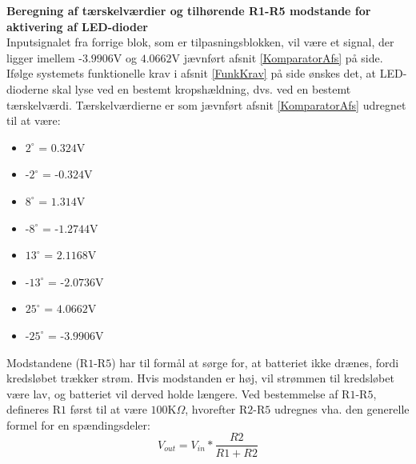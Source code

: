 \noindent\textbf{Beregning af tærskelværdier og tilhørende R1-R5 modstande for aktivering af LED-dioder} \\
Inputsignalet fra forrige blok, som er tilpasningsblokken, vil være et signal, der ligger imellem -$3.9906$V og $4.0662$V jævnført afsnit \ref{KomparatorAfs} på side\pageref{KomparatorAfs}. Ifølge systemets funktionelle krav i afsnit \ref{FunkKrav} på side \pageref{FunkKrav} ønskes det, at LED-dioderne skal lyse ved en bestemt kropshældning, dvs. ved en bestemt tærskelværdi. %
Tærskelværdierne er som jævnført afsnit \ref{KomparatorAfs} udregnet til at være:
\begin{itemize}
\item $2^{\circ}$ = $0.324$V
\item -$2^{\circ}$ = -$0.324$V
\item $8^{\circ}$ = $1.314$V
\item -$8^{\circ}$ = -$1.2744$V
\item $13^{\circ}$ = $2.1168$V
\item -$13^{\circ}$ = -$2.0736$V
\item $25^{\circ}$ = $4.0662$V
\item -$25^{\circ}$ = -$3.9906$V
\end{itemize}
Modstandene (R$1$-R$5$) har til formål at sørge for, at batteriet ikke drænes, fordi kredsløbet trækker strøm. Hvis modstanden er høj, vil strømmen til kredsløbet være lav, og batteriet vil derved holde længere.
Ved bestemmelse af R$1$-R$5$, defineres R$1$ først til at være $100$K$\Omega$, hvorefter R$2$-R$5$ udregnes vha. den generelle formel for en spændingsdeler:
\begin{equation}
V_{out}=V_{in}*\dfrac{R2}{R1+R2}
\end{equation}

